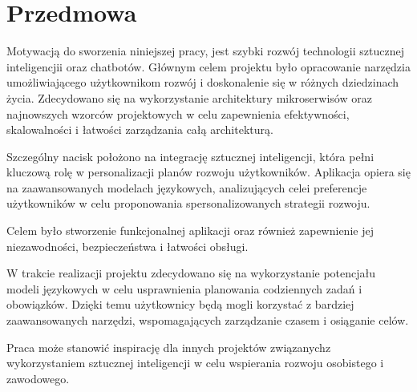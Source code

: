 \section{Przedmowa}

\indent Motywacją do sworzenia niniejszej pracy, jest szybki rozwój technologii sztucznej inteligencjii oraz chatbotów. Głównym celem  projektu było opracowanie narzędzia umożliwiającego użytkownikom rozwój i doskonalenie się w różnych dziedzinach życia. Zdecydowano się na wykorzystanie architektury mikroserwisów oraz najnowszych wzorców projektowych w celu zapewnienia efektywności, skalowalności i łatwości zarządzania całą architekturą.

Szczególny nacisk położono na integrację sztucznej inteligencji, która pełni kluczową rolę w personalizacji planów rozwoju użytkowników. Aplikacja opiera się na zaawansowanych modelach językowych, analizujących cele\linebreak i preferencje użytkowników w celu proponowania spersonalizowanych strategii rozwoju.

Celem było stworzenie funkcjonalnej aplikacji oraz również zapewnienie jej niezawodności, bezpieczeństwa i łatwości obsługi.

W trakcie realizacji projektu zdecydowano się na wykorzystanie potencjału modeli językowych w celu usprawnienia planowania codziennych zadań i obowiązków. Dzięki temu użytkownicy będą mogli korzystać z bardziej zaawansowanych narzędzi, wspomagających zarządzanie czasem i osiąganie celów.

Praca może stanowić inspirację dla innych projektów związanych\linebreak z wykorzystaniem sztucznej inteligencji w celu wspierania rozwoju osobistego i zawodowego.